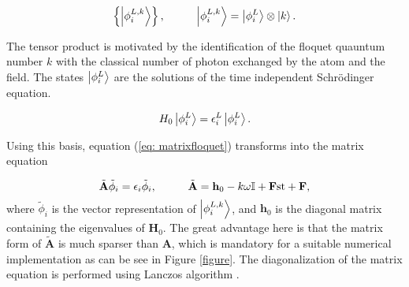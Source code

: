 \begin{equation}\label{eigenvalueproblem}
\left\lbrace\ket{\phi_{i}^{L,k}} \right\rbrace, \hspace{1cm} \ket{\phi_{i}^{L,k}}=\ket{\phi_{i}^{L}} \otimes \ket{k}.
\end{equation}

The tensor product is motivated by the identification of the floquet quauntum number $ k $ with the classical number of photon exchanged by the atom and the field. The states $ \ket{\phi_{i}^{L}} $ are the solutions of the time independent Schr\"odinger equation.



\begin{equation}\label{key}
H_{0}\ket{\phi_{i}^{L}}=\epsilon_{i}^{L}\ket{\phi_{i}^{L}}.
\end{equation}


Using this basis, equation (\ref{eq: matrixfloquet}) transforms into the matrix equation

\begin{equation}\label{matrix}
\tilde{\textbf{A}}\tilde{\phi}_{i}=\epsilon_{i}\tilde{\phi}_{i},\hspace{1cm} \tilde{\textbf{A}}=\textbf{h}_{0}-k\omega \mathbb{I}+\textbf{F{\rm st}}+\textbf{F},
\end{equation}
where $ \tilde{\phi}_{i} $ is the vector representation of $ \ket{\phi_{i}^{L,k}} $, and $ \textbf{h}_{0} $ is the diagonal matrix containing the eigenvalues of $ \textbf{H}_{0} $. The great advantage here is that the matrix form of $ \tilde{\textbf{A}} $  is much sparser than $ \textbf{A} $, which is mandatory for a suitable numerical implementation as can be see in Figure \ref{figure}. The diagonalization of the matrix equation is performed using Lanczos algorithm \cite{Lanczos:1950zz}.